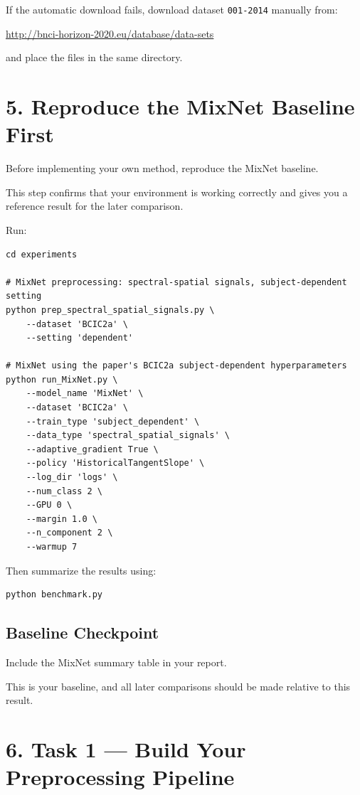 \documentclass[
  10pt,
]{article}
\begin{document}
If the automatic download fails, download dataset \texttt{001-2014}
manually from:

\url{http://bnci-horizon-2020.eu/database/data-sets}

and place the files in the same directory.

\section{5. Reproduce the MixNet Baseline
First}\label{reproduce-the-mixnet-baseline-first}

Before implementing your own method, reproduce the MixNet baseline.

This step confirms that your environment is working correctly and
gives you a reference result for the later comparison.

Run:

\begin{verbatim}
cd experiments

# MixNet preprocessing: spectral-spatial signals, subject-dependent setting
python prep_spectral_spatial_signals.py \
    --dataset 'BCIC2a' \
    --setting 'dependent'

# MixNet using the paper's BCIC2a subject-dependent hyperparameters
python run_MixNet.py \
    --model_name 'MixNet' \
    --dataset 'BCIC2a' \
    --train_type 'subject_dependent' \
    --data_type 'spectral_spatial_signals' \
    --adaptive_gradient True \
    --policy 'HistoricalTangentSlope' \
    --log_dir 'logs' \
    --num_class 2 \
    --GPU 0 \
    --margin 1.0 \
    --n_component 2 \
    --warmup 7
\end{verbatim}

Then summarize the results using:

\begin{verbatim}
python benchmark.py
\end{verbatim}

\subsection{Baseline Checkpoint}\label{baseline-checkpoint}

Include the MixNet summary table in your report.

This is your baseline, and all later comparisons should be made
relative to this result.

\section{6. Task 1 --- Build Your Preprocessing
Pipeline}\label{task-1-build-your-preprocessing-pipeline}
\end{document}
